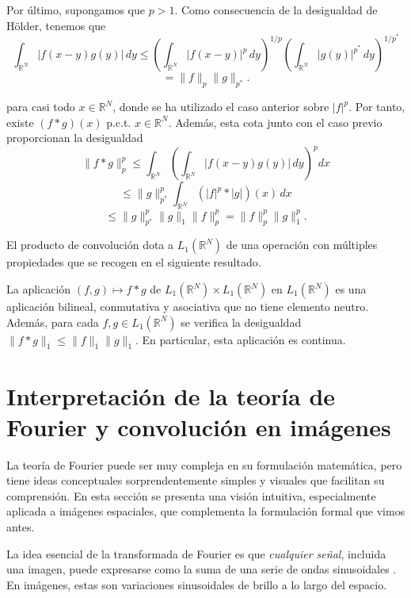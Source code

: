 \vspace{0.3cm}

Por último, supongamos que $p > 1$. Como consecuencia de la desigualdad de Hölder, tenemos que
\[
\int_{\mathbb{R}^N} |f(x - y)g(y)| \, dy \leq \left( \int_{\mathbb{R}^N} |f(x - y)|^p \, dy \right)^{1/p} \left( \int_{\mathbb{R}^N} |g(y)|^{p^*} \, dy \right)^{1/p^*}
\]
\[
= \|f\|_p \|g\|_{p^*}.
\]

para casi todo $x \in \mathbb{R}^N$, donde se ha utilizado el caso anterior sobre $|f|^p$. Por tanto, existe $(f * g)(x)$ p.c.t. $x \in \mathbb{R}^N$. Además, esta cota junto con el caso previo proporcionan la desigualdad
\[
\|f * g\|_p^p \leq \int_{\mathbb{R}^N} \left( \int_{\mathbb{R}^N} |f(x - y)g(y)| \, dy \right)^p dx
\]
\[
\leq \|g\|_{p^*}^p \int_{\mathbb{R}^N} (|f|^p * |g|)(x) \, dx
\]
\[
\leq \|g\|_{p^*}^p \|g\|_1 \|f\|_p^p = \|f\|_p^p \|g\|_1^p. \tag*{$\Box$}
\]

\vspace{0.4cm}

El producto de convolución dota a $L_1(\mathbb{R}^N)$ de una operación con múltiples propiedades que se recogen en el siguiente resultado.

\vspace{0.3cm}

\begin{proposicion}
La aplicación $(f,g) \mapsto f * g$ de $L_1(\mathbb{R}^N) \times L_1(\mathbb{R}^N)$ en $L_1(\mathbb{R}^N)$ es una aplicación bilineal, conmutativa y asociativa que no tiene elemento neutro. Además, para cada $f, g \in L_1(\mathbb{R}^N)$ se verifica la desigualdad $\|f * g\|_1 \leq \|f\|_1 \|g\|_1$. En particular, esta aplicación es continua.

\end{proposicion}


\section{Interpretación de la teoría de Fourier y convolución en imágenes}

La teoría de Fourier puede ser muy compleja en su formulación matemática, pero tiene ideas conceptuales sorprendentemente simples y visuales que facilitan su comprensión. En esta sección se presenta una visión intuitiva, especialmente aplicada a imágenes espaciales, que complementa la formulación formal que vimos antes.

La idea esencial de la transformada de Fourier es que \emph{cualquier señal}, incluida una imagen, puede expresarse como la suma de una serie de ondas sinusoidales \parencite{leharFourier}. En imágenes, estas son variaciones sinusoidales de brillo a lo largo del espacio.

